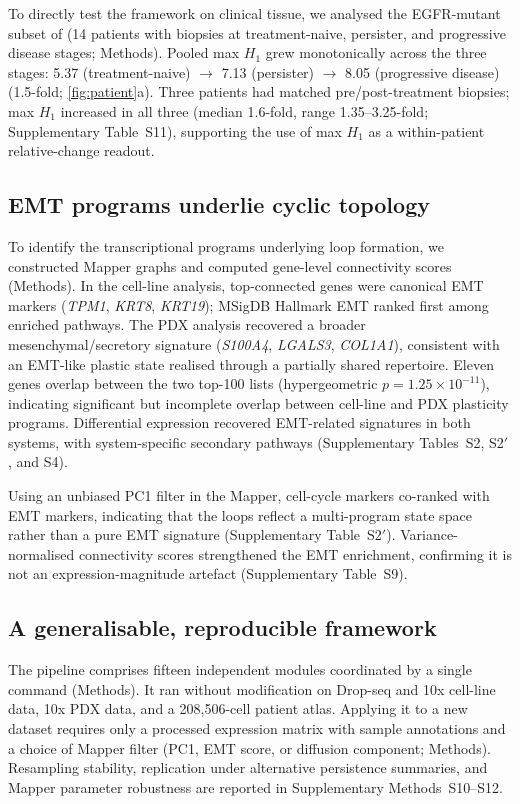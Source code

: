 To directly test the framework on clinical tissue, we analysed the
EGFR-mutant subset of \citet{maynard2020} (14 patients with biopsies
at treatment-naive, persister, and progressive disease stages;
Methods). Pooled max $H_1$ grew monotonically across the three stages:
5.37 (treatment-naive) $\to$ 7.13 (persister) $\to$ 8.05 (progressive
disease) (1.5-fold; \cref{fig:patient}a). Three patients had matched
pre/post-treatment biopsies; max $H_1$ increased in all three
(median 1.6-fold, range 1.35--3.25-fold; Supplementary Table~S11),
supporting the use of max $H_1$ as a within-patient relative-change
readout.

\subsection*{EMT programs underlie cyclic topology}

To identify the transcriptional programs underlying loop formation, we
constructed Mapper graphs and computed gene-level connectivity scores
(Methods). In the cell-line analysis, top-connected genes were canonical
EMT markers (\emph{TPM1}, \emph{KRT8}, \emph{KRT19}); MSigDB Hallmark
EMT ranked first among enriched pathways. The PDX analysis recovered a
broader mesenchymal/secretory signature (\emph{S100A4},
\emph{LGALS3}, \emph{COL1A1}), consistent with an EMT-like plastic
state realised through a partially shared repertoire. Eleven genes
overlap between the two top-100 lists (hypergeometric
$p = 1.25 \times 10^{-11}$), indicating
significant but incomplete overlap between cell-line and PDX
plasticity programs. Differential expression recovered EMT-related
signatures in both systems, with system-specific secondary pathways
(Supplementary Tables~S2, S2$'$, and S4).

Using an unbiased PC1 filter in the Mapper, cell-cycle markers
co-ranked with EMT markers, indicating that the loops reflect a
multi-program state space rather than a pure EMT signature
(Supplementary Table~S2$'$). Variance-normalised connectivity scores
strengthened the EMT enrichment, confirming it is not an
expression-magnitude artefact (Supplementary Table~S9).

\subsection*{A generalisable, reproducible framework}

The pipeline comprises fifteen independent modules coordinated by a
single command (Methods). It ran without modification on Drop-seq and
10x cell-line data, 10x PDX data, and a 208{,}506-cell patient atlas.
Applying it to a new dataset requires only a processed expression
matrix with sample annotations and a choice of Mapper filter (PC1, EMT
score, or diffusion component; Methods). Resampling stability,
replication under alternative persistence summaries, and Mapper
parameter robustness are reported in Supplementary Methods~S10--S12.
